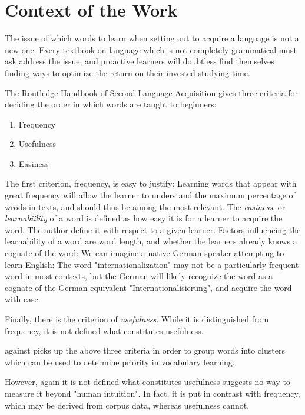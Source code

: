 \section{Context of the Work}

The issue of which words to learn when setting out to acquire a language is not a new one.
Every textbook on language which is not completely grammatical must ask address the issue, and proactive learners will doubtless find themselves finding ways to optimize the return on their invested studying time.

The Routledge Handbook of Second Language Acquisition  gives three criteria for deciding the order in which words are taught to beginners:
\begin{enumerate}
	\item Frequency
	\item Usefulness
	\item Easiness
\end{enumerate}
The first criterion, frequency, is easy to justify:
Learning words that appear with great frequency will allow the learner to understand the maximum percentage of wrods in texts, and should thus be among the most relevant.
The \textit{easiness}, or \textit{learnabiility} of a word is defined as how easy it is for a learner to acquire the word.
The author define it with respect to a given learner.
Factors influencing the learnability of a word are word length, and whether the learners already knows a cognate of the word:
We can imagine a native German speaker attempting to learn English:
The word "internationalization" may not be a particularly frequent word in most contexts, but the German will likely recognize the word as a cognate of the German equivalent "Internationalisierung", and acquire the word with ease.

Finally, there is the criterion of \textit{usefulness}.
While it is distinguished from frequency, it is not defined what constitutes usefulness.

 against picks up the above three criteria in order to group words into clusters which can be used to determine priority in vocabulary learning.

However, again it is not defined what constitutes usefulness suggests no way to measure it beyond "human intuition".
In fact, it is put in contrast with frequency, which may be derived from corpus data, whereas usefulness cannot.

